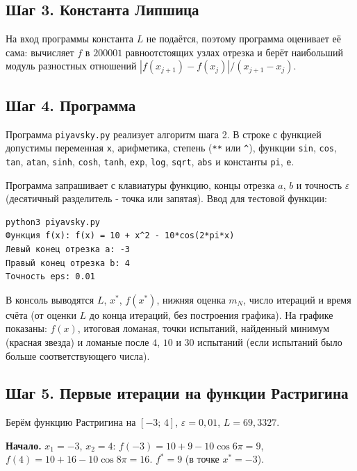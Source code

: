 \documentclass[a4paper,12pt]{article}
\begin{document}
\subsection*{Шаг 3. Константа Липшица}

На вход программы константа $L$ не подаётся, поэтому программа оценивает её сама: вычисляет $f$ в $200001$ равноотстоящих узлах отрезка и берёт наибольший модуль разностных отношений $|f(x_{j+1}) - f(x_j)|/(x_{j+1} - x_j)$.

\subsection*{Шаг 4. Программа}

Программа \texttt{piyavsky.py} реализует алгоритм шага 2. В строке с функцией допустимы переменная \texttt{x}, арифметика, степень (\texttt{**} или \texttt{\^{}}), функции \texttt{sin}, \texttt{cos}, \texttt{tan}, \texttt{atan}, \texttt{sinh}, \texttt{cosh}, \texttt{tanh}, \texttt{exp}, \texttt{log}, \texttt{sqrt}, \texttt{abs} и константы \texttt{pi}, \texttt{e}.

Программа запрашивает с клавиатуры функцию, концы отрезка $a$, $b$ и точность $\varepsilon$ (десятичный разделитель - точка или запятая). Ввод для тестовой функции:

\begin{minipage}{\textwidth}
\begin{verbatim}
python3 piyavsky.py
Функция f(x): f(x) = 10 + x^2 - 10*cos(2*pi*x)
Левый конец отрезка a: -3
Правый конец отрезка b: 4
Точность eps: 0.01
\end{verbatim}
\end{minipage}
\medskip

В консоль выводятся $L$, $x^*$, $f(x^*)$, нижняя оценка $m_N$, число итераций и время счёта (от оценки $L$ до конца итераций, без построения графика). На графике показаны: $f(x)$, итоговая ломаная, точки испытаний, найденный минимум (красная звезда) и ломаные после $4$, $10$ и $30$ испытаний (если испытаний было больше соответствующего числа).

\subsection*{Шаг 5. Первые итерации на функции Растригина}

Берём функцию Растригина на $[-3;\,4]$, $\varepsilon = 0{,}01$, $L = 69{,}3327$.

\textbf{Начало.} $x_1 = -3$, $x_2 = 4$: $f(-3) = 10 + 9 - 10\cos 6\pi = 9$, $f(4) = 10 + 16 - 10\cos 8\pi = 16$. $f^* = 9$ (в точке $x^* = -3$).
\end{document}
